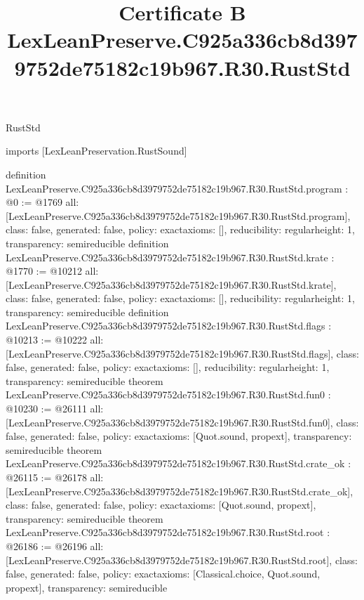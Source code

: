 \begin{lexlean}{RustStd}
\title{Certificate B LexLeanPreserve.C925a336cb8d3979752de75182c19b967.R30.RustStd}
\begin{coremodule}
imports [LexLeanPreservation.RustSound]

definition LexLeanPreserve.C925a336cb8d3979752de75182c19b967.R30.RustStd.program : @0 := @1769 {
  all: [LexLeanPreserve.C925a336cb8d3979752de75182c19b967.R30.RustStd.program],
  class: false,
  generated: false,
  policy: exact{axioms: []},
  reducibility: regular{height: 1},
  transparency: semireducible
}
definition LexLeanPreserve.C925a336cb8d3979752de75182c19b967.R30.RustStd.krate : @1770 := @10212 {
  all: [LexLeanPreserve.C925a336cb8d3979752de75182c19b967.R30.RustStd.krate],
  class: false,
  generated: false,
  policy: exact{axioms: []},
  reducibility: regular{height: 1},
  transparency: semireducible
}
definition LexLeanPreserve.C925a336cb8d3979752de75182c19b967.R30.RustStd.flags : @10213 := @10222 {
  all: [LexLeanPreserve.C925a336cb8d3979752de75182c19b967.R30.RustStd.flags],
  class: false,
  generated: false,
  policy: exact{axioms: []},
  reducibility: regular{height: 1},
  transparency: semireducible
}
theorem LexLeanPreserve.C925a336cb8d3979752de75182c19b967.R30.RustStd.fun0 : @10230 := @26111 {
  all: [LexLeanPreserve.C925a336cb8d3979752de75182c19b967.R30.RustStd.fun0],
  class: false,
  generated: false,
  policy: exact{axioms: [Quot.sound, propext]},
  transparency: semireducible
}
theorem LexLeanPreserve.C925a336cb8d3979752de75182c19b967.R30.RustStd.crate_ok : @26115 := @26178 {
  all: [LexLeanPreserve.C925a336cb8d3979752de75182c19b967.R30.RustStd.crate_ok],
  class: false,
  generated: false,
  policy: exact{axioms: [Quot.sound, propext]},
  transparency: semireducible
}
theorem LexLeanPreserve.C925a336cb8d3979752de75182c19b967.R30.RustStd.root : @26186 := @26196 {
  all: [LexLeanPreserve.C925a336cb8d3979752de75182c19b967.R30.RustStd.root],
  class: false,
  generated: false,
  policy: exact{axioms: [Classical.choice, Quot.sound, propext]},
  transparency: semireducible
}


\end{coremodule}
\end{lexlean}
